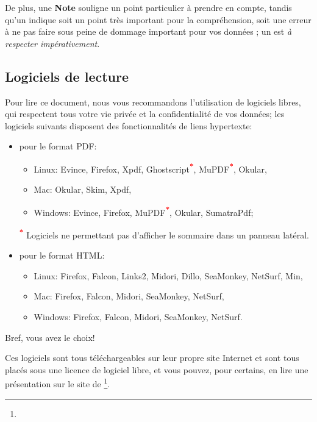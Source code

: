 De plus, une \textbf{Note} souligne un point particulier à prendre en compte, tandis qu'un \textcolor{red}{} indique soit un point très important pour la compréhension, soit une erreur à ne pas faire sous peine de dommage important pour vos données ; un \textcolor{red}{} est \emph{à respecter impérativement}.


\subsection{Logiciels de lecture\label{introduction-manual-readers}}

Pour lire ce document, nous vous recommandons l'utilisation de logiciels libres, qui respectent tous votre vie privée et la confidentialité de vos données; les logiciels suivants disposent des fonctionnalités de \gls{liens hypertexte}: 
\begin{itemize}
	\item pour le format \gls{PDF}: 
		\begin{itemize}
				\item Linux: Evince, Firefox, Xpdf, Ghostscript\textsuperscript{\textcolor{red}{\textbf{*}}}, MuPDF\textsuperscript{\textcolor{red}{\textbf{*}}}, Okular,
				\item Mac: Okular, Skim, Xpdf,
				\item Windows: Evince, Firefox, MuPDF\textsuperscript{\textcolor{red}{\textbf{*}}}, Okular, SumatraPdf;
		\end{itemize}
		\textsuperscript{\textcolor{red}{\textbf{*}}} Logiciels ne permettant pas d'afficher le sommaire dans un panneau latéral.
	\item pour le format \gls{HTML}:
		\begin{itemize}
				\item Linux: Firefox, Falcon, Links2, Midori, Dillo, SeaMonkey, NetSurf, Min,
				\item Mac: Firefox, Falcon, Midori, SeaMonkey, NetSurf,
				\item Windows: Firefox, Falcon, Midori, SeaMonkey, NetSurf.
		\end{itemize}
\end{itemize}

Bref, vous avez le choix!

Ces logiciels sont tous téléchargeables sur leur propre site Internet et sont tous placés sous une licence de \gls{logiciel libre}, et vous pouvez, pour certains, en lire une présentation sur le site de \footnote{\urlFramasoftLogiciels{}}.
